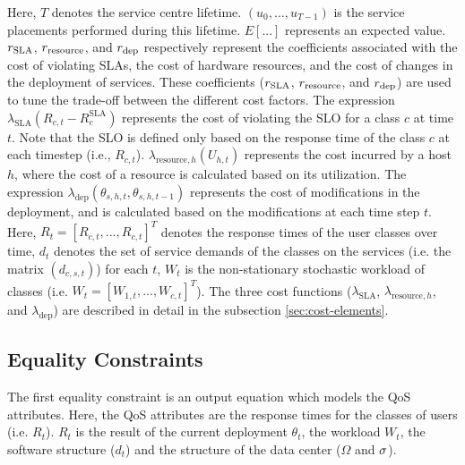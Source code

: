 %
Here, $T$ denotes the service centre lifetime. $(u_0,...,u_{T-1})$ is the service placements performed during this lifetime. $E\left[...\right]$ represents an expected value. $r_{\text{SLA}}$, $r_{\text{resource}}$, and $r_{\text{dep}}$ respectively represent the coefficients associated with the cost of violating SLAs, the cost of hardware resources, and the cost of changes in the deployment of services. These coefficients ($r_{\text{SLA}}$, $r_{\text{resource}}$, and $r_{\text{dep}}$) are used to tune the trade-off between the different cost factors. The expression $\lambda_\text{SLA}(R_{c,t} - R_c^\text{SLA})$ represents the cost of violating the SLO for a class $c$ at time $t$. 
Note that the SLO is defined only based on the response time of the class $c$ at each timestep (i.e., $R_{c,t}$).  
$\lambda_{\text{resource},h}(U_{h,t})$  represents the cost incurred by a host $h$, where the cost of a resource is calculated based on its utilization.
The expression $\lambda_\text{dep}(\theta_{s,h,t},\theta_{s,h,t-1})$ represents the cost of modifications in the deployment, and is calculated based on the modifications at each time step $t$. 
 Here, 
  $R_t = [R_{c,t},...,R_{c,t}]^T$ denotes the response times of the user classes over time, 
  $d_{t}$ denotes the set of service demands of the classes on the services (i.e. the matrix $(d_{c,s,t})$) for each $t$,  
 $W_t$ is the non-stationary stochastic workload of classes (i.e. $W_t = [W_{1,t},..., W_{c,t}]^T$). 
 The three cost functions ($\lambda_\text{SLA}$, $\lambda_{\text{resource},h}$, and $\lambda_\text{dep}$) are described in detail in the subsection \ref{sec:cost-elements}.  

\subsection{Equality Constraints} 
 The first equality constraint is an output equation which models the QoS attributes. Here, the QoS attributes are the response times for the classes of users (i.e. $R_t$). $R_t$ is the result of the current deployment $\theta_{t}$, the workload $W_t$, the software structure ($d_{t}$) and the structure of the data center ($\Omega$ and $\sigma$).
 

